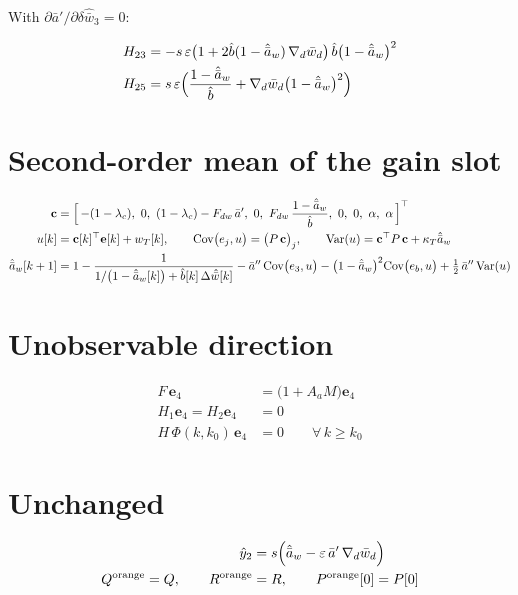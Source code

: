 \documentclass[11pt,a4paper,fontset=none]{ctexart}
\newcommand{\ba}{\bar{a}}
\newcommand{\bw}{\bar{w}}
\newcommand{\dWh}{\Delta\hat{\bw}}
\newcommand{\ap}{\ba'}
\newcommand{\app}{\ba''}
\newcommand{\ah}{\hat{\ba}_w}
\newcommand{\bh}{\hat{b}}
\newcommand{\Cov}{\mathrm{Cov}}
\newcommand{\Var}{\mathrm{Var}}
\begin{document}
With $\partial\ap/\partial\delta\hat{\bw}_3 = 0$:

\begin{align*}
H_{23} &= -s\,\varepsilon\bigl(1 + 2\bh(1-\ah)\,\nabla_d\bw_d\bigr)\,\bh\bigl(1-\ah\bigr)^{2} \\
H_{25} &= s\,\varepsilon\Bigl(\frac{1-\ah}{\bh} + \nabla_d\bw_d\bigl(1-\ah\bigr)^{2}\Bigr)
\end{align*}

\section{Second-order mean of the gain slot}

\begin{align*}
\mathbf{c} &= \Bigl[\,-(1-\lambda_c),\ 0,\ (1-\lambda_c) - F_{dw}\,\ap,\ 0,\ F_{dw}\,\frac{1-\ah}{\bh},\ 0,\ 0,\ \alpha,\ \alpha\,\Bigr]^{\top} \\
u[k] &= \mathbf{c}[k]^{\top}\mathbf{e}[k] + w_T[k], \qquad
\Cov\bigl(e_j, u\bigr) = \bigl(P\,\mathbf{c}\bigr)_j, \qquad \Var(u) = \mathbf{c}^{\top}P\,\mathbf{c} + \kappa_T\ah \\
\ah[k+1] &= 1 - \frac{1}{1/\bigl(1-\ah[k]\bigr) + \bh[k]\,\dWh[k]}
            - \app\,\Cov\bigl(e_3, u\bigr) - \bigl(1-\ah\bigr)^{2}\Cov\bigl(e_b, u\bigr) + \tfrac{1}{2}\,\app\,\Var(u)
\end{align*}

\section{Unobservable direction}

\begin{align*}
F\,\mathbf{e}_4 &= \bigl(1 + A_a M\bigr)\mathbf{e}_4 \\
H_1\mathbf{e}_4 = H_2\mathbf{e}_4 &= 0 \\
H\,\Phi(k, k_0)\,\mathbf{e}_4 &= 0 \qquad \forall\,k \ge k_0
\end{align*}

\section{Unchanged}

\begin{align*}
\hat{y}_2 &= s\Bigl(\ah - \varepsilon\,\ap\,\nabla_d\bw_d\Bigr) \\
Q^{\mathrm{orange}} = Q, \qquad R^{\mathrm{orange}} &= R, \qquad P^{\mathrm{orange}}[0] = P[0]
\end{align*}
\end{document}
